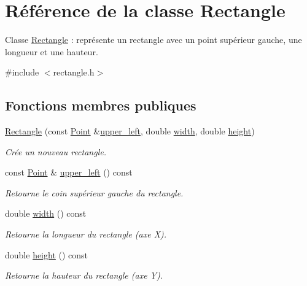 \hypertarget{classRectangle}{\section{Référence de la classe Rectangle}
\label{classRectangle}
}


Classe \hyperlink{classRectangle}{Rectangle} \+: représente un rectangle avec un point supérieur gauche, une longueur et une hauteur.  




{\ttfamily \#include $<$rectangle.\+h$>$}

\subsection*{Fonctions membres publiques}
\begin{DoxyCompactItemize}
\item 
\hyperlink{classRectangle_a782e2380748066e1fd339a5a44e9eb13}{Rectangle} (const \hyperlink{classPoint}{Point} \&\hyperlink{classRectangle_aa8daaedf1bf1de9b84d81c8b09c0ee53}{upper\+\_\+left}, double \hyperlink{classRectangle_af1c00b4fce87c93d883d1038b22fdbbf}{width}, double \hyperlink{classRectangle_a5ac391528a35b90ae1bb3c2ccd059df1}{height})
\begin{DoxyCompactList}\small\item\em Crée un nouveau rectangle. \end{DoxyCompactList}\item 
const \hyperlink{classPoint}{Point} \& \hyperlink{classRectangle_aa8daaedf1bf1de9b84d81c8b09c0ee53}{upper\+\_\+left} () const 
\begin{DoxyCompactList}\small\item\em Retourne le coin supérieur gauche du rectangle. \end{DoxyCompactList}\item 
double \hyperlink{classRectangle_af1c00b4fce87c93d883d1038b22fdbbf}{width} () const 
\begin{DoxyCompactList}\small\item\em Retourne la longueur du rectangle (axe X). \end{DoxyCompactList}\item 
double \hyperlink{classRectangle_a5ac391528a35b90ae1bb3c2ccd059df1}{height} () const 
\begin{DoxyCompactList}\small\item\em Retourne la hauteur du rectangle (axe Y). \end{DoxyCompactList}\end{DoxyCompactItemize}


